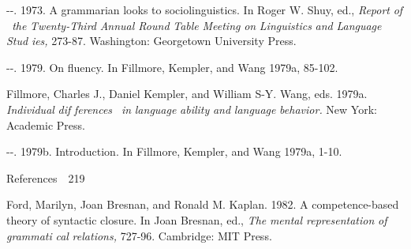 \begin{listWWNumviiileveli}
\item 
\begin{styleStandard}
{}-{}-. 1973. A grammarian looks to sociolinguistics. In Roger W. Shuy, ed., \textit{Report}\textit{ }\textit{of}\textit{ \ }\textit{the}\textit{ }\textit{Twenty-Third}\textit{ }\textit{Annual Round}\textit{ }\textit{Table}\textit{ }\textit{Meeting}\textit{ }\textit{on}\textit{ }\textit{Linguistics}\textit{ }\textit{and}\textit{ }\textit{Language}\textit{ }\textit{Stud\-}\textit{ }\textit{ies,}\textit{ }273-87. Washington: Georgetown University Press.
\end{styleStandard}


\item 
\begin{styleStandard}
{}-{}-. 1979. On fluency. In Fillmore, Kempler, and Wang 1979a, 85-102.
\end{styleStandard}


\end{listWWNumviiileveli}
\begin{styleStandard}
Fillmore, Charles J., Daniel Kempler, and William S-Y. Wang, eds. 1979a. \textit{Individual}\textit{ }\textit{dif\-}\textit{ }\textit{ferences }\textit{\ }\textit{in}\textit{ }\textit{language}\textit{ }\textit{ability}\textit{ }\textit{and}\textit{ }\textit{language}\textit{ }\textit{behavior.}\textit{ }New York: Academic Press.
\end{styleStandard}


\begin{listWWNumviiileveli}
\item 
\begin{styleStandard}
{}-{}-. 1979b. Introduction. In Fillmore, Kempler, and Wang 1979a, 1-10.
\end{styleStandard}


\end{listWWNumviiileveli}
\clearpage\setcounter{page}{1}\begin{styleStandard}
References\ \ 219
\end{styleStandard}


\begin{styleStandard}
Ford, Marilyn, Joan Bresnan, and Ronald M. Kaplan. 1982. A competence-based theory of syntactic closure. In Joan Bresnan, ed., \textit{The}\textit{ }\textit{mental representation}\textit{ }\textit{of}\textit{ }\textit{grammati\-}\textit{ }\textit{cal}\textit{ }\textit{relations,}\textit{ }727-96. Cambridge: MIT Press.
\end{styleStandard}


